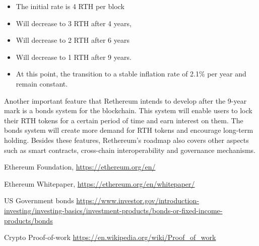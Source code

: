 \documentclass[a4paper,onecolumn, superscriptaddress,10pt,accepted=2020-05-01,issue=1, volume=2, shorttitle=papers]{compositionalityarticle}
\begin{document}
\begin{itemize}
    \item The initial rate is 4 RTH per block
\end{itemize}
\begin{itemize}
    \item Will decrease to 3 RTH after 4 years,
\end{itemize}
\begin{itemize}
    \item Will decrease to 2 RTH after 6 years
\end{itemize}
\begin{itemize}
    \item Will decrease to 1 RTH after 9 years.
    \item At this point, the transition to a stable inflation rate of 2.1\% per year and remain constant.
\end{itemize}

Another important feature that Rethereum intends to develop after the 9-year mark is a bonds system for the blockchain. This system will enable users to lock their RTH tokens for a certain period of time and earn interest on them. The bonds system will create more demand for RTH tokens and encourage long-term holding. Besides these features, Rethereum's roadmap also covers other aspects such as smart contracts, cross-chain interoperability and governance mechanisms.



\newpage


\begin{thebibliography}{9}
  Ethereum Foundation,
  \href{https://ethereum.org/en/}{https://ethereum.org/en/}

  Ethereum Whitepaper,
  \href{https://ethereum.org/en/whitepaper/}{https://ethereum.org/en/whitepaper/}

  US Government bonds 
  \href{https://www.investor.gov/introduction-investing/investing-basics/investment-products/bonds-or-fixed-income-products/bonds}{https://www.investor.gov/introduction-investing/investing-basics/investment-products/bonds-or-fixed-income-products/bonds}

  Crypto Proof-of-work 
  \href{https://en.wikipedia.org/wiki/Proof_of_work}{https://en.wikipedia.org/wiki/Proof_of_work}


\end{thebibliography}



\onecolumn\newpage
\end{document}
